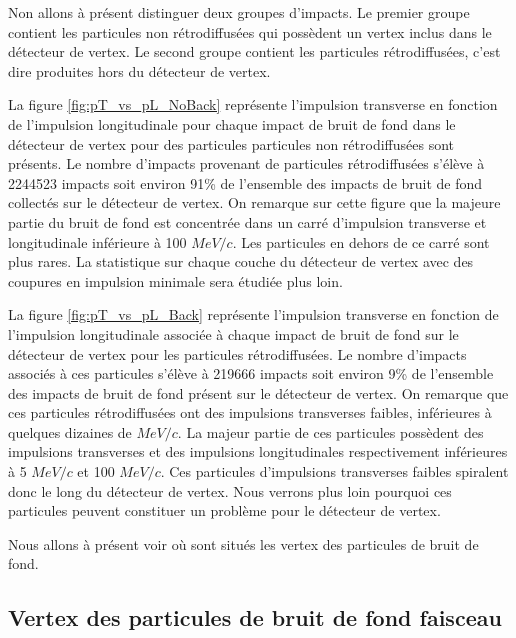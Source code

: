   Non allons \`a pr\'esent distinguer deux groupes d'impacts. Le premier groupe contient les particules non r\'etrodiffus\'ees qui poss\`edent un vertex inclus dans le d\'etecteur de vertex. Le second groupe contient les particules r\'etrodiffus\'ees, c'est dire produites hors du d\'etecteur de vertex.
  
  \medskip
  
  La figure \ref{fig:pT_vs_pL_NoBack} repr\'esente l'impulsion transverse en fonction de l'impulsion longitudinale pour chaque impact de bruit de fond dans le d\'etecteur de vertex pour des particules particules non r\'etrodiffus\'ees sont pr\'esents. Le nombre d'impacts provenant de particules r\'etrodiffus\'ees s'\'el\`eve \`a 2244523 impacts soit environ 91\% de l'ensemble des impacts de bruit de fond collect\'es sur le d\'etecteur de vertex. On remarque sur cette figure que la majeure partie du bruit de fond est concentr\'ee dans un carr\'e d'impulsion transverse et longitudinale inf\'erieure \`a 100 $MeV/c$. Les particules en dehors de ce carr\'e sont plus rares. La statistique sur chaque couche du d\'etecteur de vertex avec des coupures en impulsion minimale sera \'etudi\'ee plus loin.
  
  \medskip
  
  La figure \ref{fig:pT_vs_pL_Back} repr\'esente l'impulsion transverse en fonction de l'impulsion longitudinale associ\'ee \`a chaque impact de bruit de fond sur le d\'etecteur de vertex pour les particules r\'etrodiffus\'ees. Le nombre d'impacts associ\'es \`a ces particules s'\'el\`eve \`a 219666 impacts soit environ 9\% de l'ensemble des impacts de bruit de fond pr\'esent sur le d\'etecteur de vertex. On remarque que ces particules r\'etrodiffus\'ees ont des impulsions transverses faibles, inf\'erieures \`a quelques dizaines de $MeV/c$. La majeur partie de ces particules poss\`edent des impulsions transverses et des impulsions longitudinales respectivement inf\'erieures \`a 5 $MeV/c$ et 100 $MeV/c$. Ces particules d'impulsions transverses faibles spiralent donc le long du détecteur de vertex. Nous verrons plus loin pourquoi ces particules peuvent constituer un probl\`eme pour le d\'etecteur de vertex. 
  
  \medskip
  
  Nous allons \`a pr\'esent voir o\`u sont situ\'es les vertex des particules de bruit de fond.
  
  \FloatBarrier
  
\subsection{Vertex des particules de bruit de fond faisceau}

